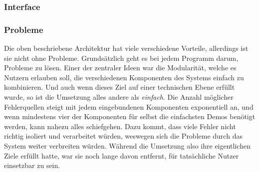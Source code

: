 \documentclass[11pt]{article}
\begin{document}
\subsubsection{Interface}
\label{sec:org717f3ba}
\subsubsection{Probleme}
\label{sec:orge8a2a6b}
Die oben beschriebene Architektur hat viele verschiedene Vorteile,
allerdings ist sie nicht ohne Probleme. Grundsätzlich geht es bei
jedem Programm darum, Probleme zu lösen. Einer der zentraler Ideen war
die Modularität, welche es Nutzern erlauben soll, die verschiedenen
Komponenten des Systems einfach zu kombinieren. Und auch wenn dieses
Ziel auf einer technischen Ebene erfüllt wurde, so ist die Umsetzung
alles andere als \emph{einfach}. Die Anzahl möglicher Fehlerquellen steigt
mit jedem eingebundenen Komponenten exponentiell an, und wenn
mindestens vier der Komponenten für selbst die einfachsten Demos
benötigt werden, kann nahezu alles schiefgehen. Dazu kommt, dass viele
Fehler nicht richtig isoliert und verarbeitet würden, weswegen sich
die Probleme durch das System weiter verbreiten würden. Während die
Umsetzung also ihre eigentlichen Ziele erfüllt hatte, war sie noch
lange davon entfernt, für tatsächliche Nutzer einsetzbar zu sein.\\
\end{document}

